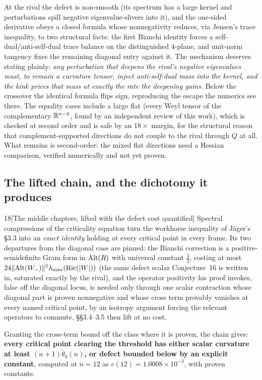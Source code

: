 At the rival the defect is non-smooth (its spectrum has a large kernel and perturbations spill negative eigenvalue-slivers into it), and the one-sided derivative obeys a closed formula whose nonnegativity reduces, via Jensen's trace inequality, to two structural facts: the first Bianchi identity forces a self-dual/anti-self-dual trace balance on the distinguished $4$-plane, and unit-norm tangency fixes the remaining diagonal entry against it. The mechanism deserves stating plainly: \emph{any perturbation that deepens the rival's negative eigenvalues must, to remain a curvature tensor, inject anti-self-dual mass into the kernel, and the kink prices that mass at exactly the rate the deepening gains.} Below the crossover the identical formula flips sign, reproducing the escape the numerics see there. The equality cases include a large flat (every Weyl tensor of the complementary $\mathbb{R}^{n-4}$, found by an independent review of this work), which is checked at second order and is safe by an $18\times$ margin, for the structural reason that complement-supported directions do not couple to the rival through $Q$ at all. What remains is second-order: the mixed flat directions need a Hessian comparison, verified numerically and not yet proven.

\subsection{The lifted chain, and the dichotomy it produces}

\begin{Lem}{18}[The middle chapters, lifted with the defect cost quantified]
Spectral compressions of the criticality equation turn the workhorse inequality of J\"ager's \S3.3 into an \emph{exact identity} holding at every critical point in every frame. Its two departures from the diagonal case are pinned: the Bianchi correction is a positive-semidefinite Gram form in $\mathrm{Alt}(R)$ with universal constant $\tfrac32$, costing at most $24\|\mathrm{Alt}(W_-)\|^2\lambda_{\max}(\mathrm{Ric}(|W|))$ (the same defect scalar Conjecture~16 is written in, saturated exactly by the rival), and the operator positivity his proof invokes, false off the diagonal locus, is needed only through one scalar contraction whose diagonal part is proven nonnegative and whose cross term provably vanishes at every named critical point, by an isotropy argument forcing the relevant operators to commute. \S\S3.4--3.5 then lift at no cost.

Granting the cross-term bound off the class where it is proven, the chain gives: \textbf{every critical point clearing the threshold has either scalar curvature at least $(n+1)\tilde\theta_0(n)$, or defect bounded below by an explicit constant}, computed at $n=12$ as $c(12)=1.0008\times10^{-3}$, with proven constants.
\end{Lem}

